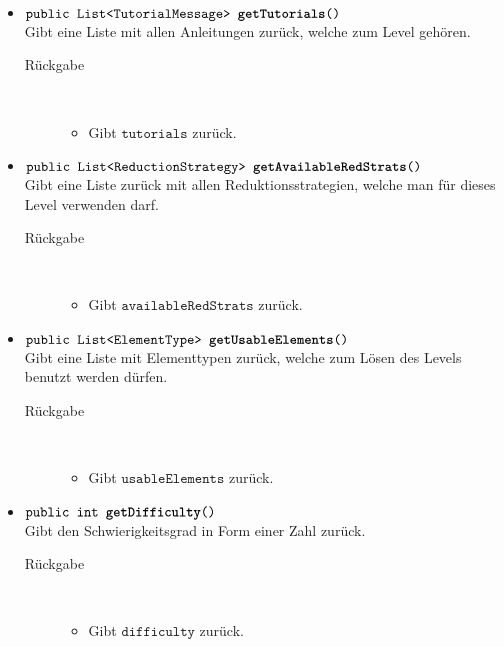 \begin{description}
\begin{itemize}
		\item $\texttt{public List<TutorialMessage> \textbf{getTutorials}()}$ \\ Gibt eine Liste mit allen Anleitungen zurück, welche zum Level gehören.
		\begin{description}
			\item[Rückgabe] \hfill \\
			\vspace{-.8cm}
			\begin{itemize}
				\item Gibt $\texttt{tutorials}$ zurück.
			\end{itemize}
			\end{description}
			
		\item $\texttt{public List<ReductionStrategy> \textbf{getAvailableRedStrats}()}$ \\ Gibt eine Liste zurück mit allen Reduktionsstrategien, welche man für dieses Level verwenden darf.
		\begin{description}
			\item[Rückgabe] \hfill \\
			\vspace{-.8cm}
			\begin{itemize}
				\item Gibt $\texttt{availableRedStrats}$ zurück.
			\end{itemize}
			\end{description}
			
		\item $\texttt{public List<ElementType> \textbf{getUsableElements}()}$ \\ Gibt eine Liste mit Elementtypen zurück, welche zum Lösen des Levels benutzt werden dürfen.
			\begin{description}
			\item[Rückgabe] \hfill \\
			\vspace{-.8cm}
			\begin{itemize}
				\item Gibt $\texttt{usableElements}$ zurück.
			\end{itemize}
			\end{description}
			
		\item $\texttt{public int \textbf{getDifficulty}()}$ \\ Gibt den Schwierigkeitsgrad in Form einer Zahl zurück.
		\begin{description}
			\item[Rückgabe] \hfill \\
			\vspace{-.8cm}
			\begin{itemize}
				\item Gibt $\texttt{difficulty}$ zurück.
			\end{itemize}
			\end{description}
			

\end{itemize}
\end{description}
